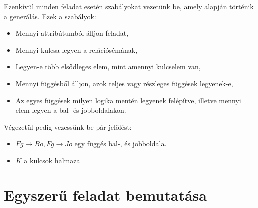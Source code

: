Ezenkívül minden feladat esetén szabályokat vezetünk be, amely alapján történik a generálás. Ezek a szabályok:
\begin{itemize}
    \item Mennyi attribútumból álljon feladat,
    \item Mennyi kulcsa legyen a relációsémának,
    \item Legyen-e több elsődleges elem, mint amennyi kulcselem van,
    \item Mennyi függésből álljon, azok teljes vagy részleges függések legyenek-e,
    \item Az egyes függések milyen logika mentén legyenek felépítve, illetve mennyi elem legyen a bal- és jobboldalakon. 
\end{itemize}
Végezetül pedig vezessünk be pár jelölést:
\begin{itemize}
    \item $Fg\rightarrow Bo, Fg \rightarrow Jo$ egy függés bal-, és jobboldala.
    \item $K$ a kulcsok halmaza
\end{itemize}

\section{Egyszerű feladat bemutatása}

